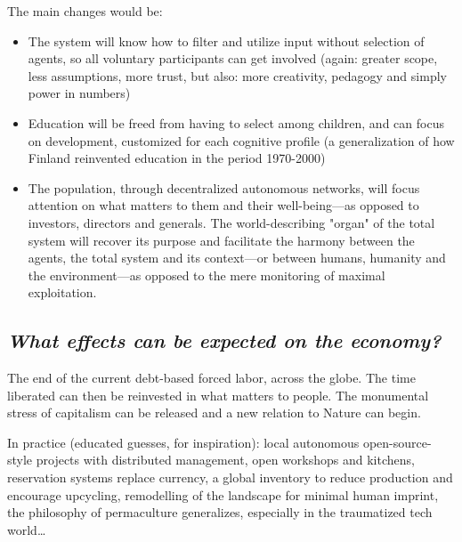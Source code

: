 \documentclass[11pt]{article}
\begin{document}
The main changes would be:

\begin{itemize}

\item The system will know how to filter and utilize input without selection of agents, so all
voluntary participants can get involved (again: greater scope, less assumptions, more
trust, but also: more creativity, pedagogy and simply power in numbers)

\item Education will be freed from having to select among children, and can focus on
development, customized for each cognitive profile (a generalization of how Finland
reinvented education in the period 1970-2000)

\item The population, through decentralized autonomous networks, will focus attention on what
matters to them and their well-being---as opposed to investors, directors and generals.
The world-describing "organ" of the total system will recover its purpose and facilitate
the harmony between the agents, the total system and its context---or between humans,
humanity and the environment---as opposed to the mere monitoring of maximal
exploitation.

\end{itemize}

\subsection*{\emph{What effects can be expected on the economy?}}

The end of the current debt-based forced labor, across the globe. The time liberated can
then be reinvested in what matters to people. The monumental stress of capitalism can be
released and a new relation to Nature can begin.

In practice (educated guesses, for inspiration): local autonomous open-source-style
projects with distributed management, open workshops and kitchens, reservation systems
replace currency, a global inventory to reduce production and encourage upcycling,
remodelling of the landscape for minimal human imprint, the philosophy of permaculture
generalizes, especially in the traumatized tech world\ldots{}
\end{document}
